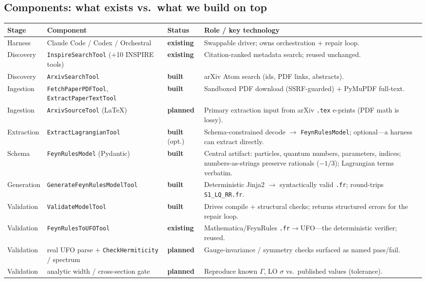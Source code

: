 \documentclass[11pt]{article}
\newcommand{\code}[1]{\texttt{#1}}
\newcommand{\EX}{\textcolor{okgreen}{\textbf{existing}}}
\newcommand{\BU}{\textcolor{accent}{\textbf{built}}}
\newcommand{\PL}{\textcolor{warn}{\textbf{planned}}}
\newcommand{\arw}{$\rightarrow$}
\begin{document}
\subsection{Components: what exists vs.\ what we build on top}

\renewcommand{\arraystretch}{1.15}
\begin{longtable}{@{}p{2.0cm} p{4.4cm} p{1.5cm} p{6.4cm}@{}}
\toprule
\textbf{Stage} & \textbf{Component} & \textbf{Status} & \textbf{Role / key technology} \\
\midrule
\endhead
Harness & Claude Code / Codex / Orchestral & \EX & Swappable driver; owns orchestration $+$ repair loop. \\
Discovery & \code{InspireSearchTool} ($+$10 INSPIRE tools) & \EX & Citation-ranked metadata search; reused unchanged. \\
Discovery & \code{ArxivSearchTool} & \BU & arXiv Atom search (ids, PDF links, abstracts). \\
Ingestion & \code{FetchPaperPDFTool}, \code{ExtractPaperTextTool} & \BU & Sandboxed PDF download (SSRF-guarded) $+$ PyMuPDF full-text. \\
Ingestion & \code{ArxivSourceTool} (LaTeX) & \PL & Primary extraction input from arXiv \code{.tex} e-prints (PDF math is lossy). \\
Extraction & \code{ExtractLagrangianTool} & \BU\,(opt.) & Schema-constrained decode \arw{} \code{FeynRulesModel}; optional---a harness can extract directly. \\
Schema & \code{FeynRulesModel} (Pydantic) & \BU & Central artifact: particles, quantum numbers, parameters, indices; numbers-as-strings preserve rationals ($-1/3$); Lagrangian terms verbatim. \\
Generation & \code{GenerateFeynRulesModelTool} & \BU & Deterministic Jinja2 \arw{} syntactically valid \code{.fr}; round-trips \code{S1\_LQ\_RR.fr}. \\
Validation & \code{ValidateModelTool} & \BU & Drives compile $+$ structural checks; returns structured errors for the repair loop. \\
Validation & \code{FeynRulesToUFOTool} & \EX & Mathematica/FeynRules \code{.fr}\arw{}UFO---the deterministic verifier; reused. \\
Validation & real UFO parse $+$ \code{CheckHermiticity} / spectrum & \PL & Gauge-invariance / symmetry checks surfaced as named pass/fail. \\
Validation & analytic width / cross-section gate & \PL & Reproduce known $\Gamma$, LO $\sigma$ vs.\ published values (tolerance). \\

\end{longtable}
\end{document}
